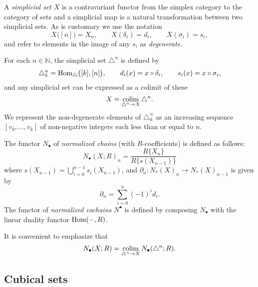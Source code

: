 A \textit{simplicial set} $X$ is a contravariant functor from the simplex category to the category of sets and a simplicial map is a natural transformation between two simplicial sets. As is customary we use the notation
\begin{equation*}
X\big( [n] \big) = X_n, \qquad X(\delta_i) = d_i, \qquad X(\sigma_i) = s_i,
\end{equation*}
and refer to elements in the image of any $s_i$ as \textit{degenerate}.

For each $n \in \mathbb{N}$, the simplicial set $\triangle^n$ is defined by
\begin{equation*}
\triangle^n_k  = \mathrm{Hom}_{\triangle} \big( [k], [n] \big), \qquad 
d_i(x) = x \circ \delta_i, \qquad 
s_i(x) = x \circ \sigma_i,
\end{equation*}
and any simplicial set can be expressed as a colimit of these
\begin{equation*}
X = \operatorname*{colim}_{\triangle^n \to X} \triangle^n.
\end{equation*}
We represent the non-degenerate elements of $\triangle^n_k$ as an increasing sequence $[v_0, \dots, v_k]$ of non-negative integers each less than or equal to $n$.

The functor $N_\bullet$ of \textit{normalized chains} (with $R$-coefficients) is defined as follows: 
\begin{equation*}
N_\bullet(X; R)_n = \frac{R \{ X_n \}}{R \{ s(X_{n-1}) \}}
\end{equation*}
where $s(X_{n-1}) = \bigcup_{i=0}^{n-1} s_i(X_{n-1})$, and $\partial_n : N_*(X)_n \to N_*(X)_{n-1}$ is given by
\begin{equation*}
\partial_n = \sum_{i=0}^{n} (-1)^id_{i}.
\end{equation*}
The functor of \textit{normalized cochains} $N^\bullet$ is defined by composing $N_\bullet$ with the linear duality functor $\mathrm{Hom}(-, R)$.

It is convenient to emphasize that
\begin{equation*}
N_\bullet(X; R) = \operatorname*{colim}_{\triangle^n \to X} N_\bullet(\triangle^n; R).
\end{equation*}

\subsection{Cubical sets}

